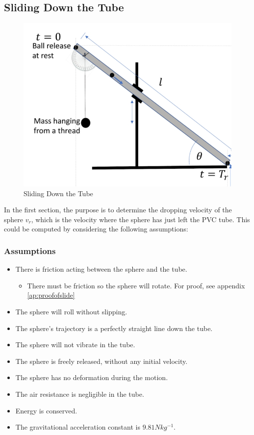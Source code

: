 \documentclass{article}
\begin{document}
    \subsection{Sliding Down the Tube}
    \begin{figure}[H]
        \centering
        \includegraphics[width=0.5\linewidth]{down_pvc.png}
        \caption{Sliding Down the Tube}
        \label{fig:section1}
    \end{figure}
        In the first section, the purpose is to determine the dropping velocity of the sphere $v_r$, which is the velocity where the sphere has just left the PVC tube. This could be computed by considering the following assumptions:
        \subsubsection{Assumptions}
            \begin{itemize}
                \item There is friction acting between the sphere and the tube. 
                    \begin{itemize}
                        \item There must be friction so the sphere will rotate. For proof, see appendix \ref{ap:proofofslide}
                    \end{itemize}
                \item The sphere will roll without slipping.
                \item The sphere's trajectory is a perfectly straight line down the tube.
                \item The sphere will not vibrate in the tube.
                \item The sphere is freely released, without any initial velocity.
                \item The sphere has no deformation during the motion.
                \item The air resistance is negligible in the tube.
                \item Energy is conserved.
                \item The gravitational acceleration constant is $9.81Nkg^{-1}$.
            \end{itemize}
\end{document}
